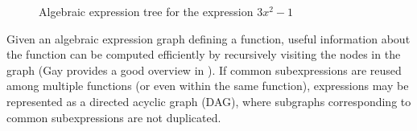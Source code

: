 \documentclass[smallextended]{svjour3}
\begin{document}
\begin{figure}
    \begin{center}
    \end{center}
    \caption{Algebraic expression tree for the expression $3x^2 -1$}
    \label{fig:expression-tree}
\end{figure}
Given an algebraic expression graph defining a function, useful information about
the function can be computed efficiently by recursively visiting the nodes in the
graph (Gay provides a good overview in \cite{gay2012}).
If common subexpressions are reused among multiple functions (or even within the same
function), expressions may be represented as a directed acyclic graph (DAG), where
subgraphs corresponding to common subexpressions are not duplicated.
\end{document}
